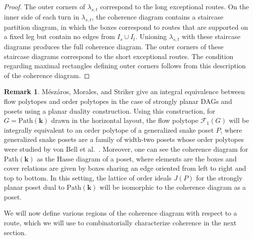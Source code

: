 \documentclass[12pt]{amsart}
\theoremstyle{definition}
\newtheorem{remark}[theorem]{Remark}
\newcommand\bk{\mathbf{k}}
\newcommand\calF{\mathcal{F}}
\newcommand\Path{\mathrm{Path}}
\begin{document}
\begin{proof}
The outer corners of $\lambda_{s,t}$ correspond to the long exceptional routes.
On the inner side of each turn in $\lambda_{s,t}$, the coherence diagram contains a staircase partition diagram, in which the boxes correspond to routes that are supported on a fixed leg but contain no edges from $I_s\cup I_t$.
Unioning $\lambda_{s,t}$ with these staircase diagrams produces the full coherence diagram.
The outer corners of these staircase diagrams correspond to the short exceptional routes.
The condition regarding maximal rectangles defining outer corners follows from this description of the coherence diagram.
\end{proof}

\begin{remark}
    Mészáros, Morales, and Striker \cite{MMS19} give an integral equivalence between flow polytopes and order polytopes in the case of strongly planar DAGs and posets using a planar duality construction.
    Using this construction, for $G = \Path(\bk)$ drawn in the horizontal layout, the flow polytope $\calF_1(G)$ will be integrally equivalent to an order polytope of a generalized snake poset $P$, where generalized snake posets are a family of width-two posets whose order polytopes were studied by von Bell et al.~\cite{gensnakeposets}.
    Moreover, one can see the coherence diagram for $\Path(\bk)$ as the Hasse diagram of a poset, where elements are the boxes and cover relations are given by boxes sharing an edge oriented from left to right and top to bottom.
    In this setting, the lattice of order ideals $J(P)$ for the strongly planar poset dual to $\Path(\bk)$ will be isomorphic to the coherence diagram as a poset. 
\end{remark}

We will now define various regions of the coherence diagram with respect to a route, which we will use to combinatorially characterize coherence in the next section.
\end{document}
